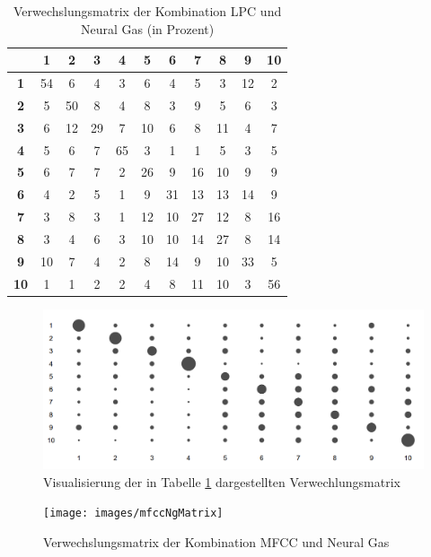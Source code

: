 \begin{table}[h]
	\centering
	\begin{tabular}{c|cccccccccc}
		& \textbf{1} & \textbf{2} & \textbf{3} & \textbf{4} & \textbf{5} & \textbf{6} & \textbf{7} & \textbf{8} & \textbf{9} & \textbf{10} \\ \hline
		\textbf{1} & 54 & 6 & 4 & 3 & 6 & 4 & 5 & 3 & 12 & 2 \\
		\textbf{2} & 5 & 50 & 8 & 4 & 8 & 3 & 9 & 5 & 6 & 3 \\
		\textbf{3} & 6 & 12 & 29 & 7 & 10 & 6 & 8 & 11 & 4 & 7 \\
		\textbf{4} & 5 & 6 & 7 & 65 & 3 & 1 & 1 & 5 & 3 & 5 \\
		\textbf{5} & 6 & 7 & 7 & 2 & 26 & 9 & 16 & 10 & 9 & 9 \\
		\textbf{6} & 4 & 2 & 5 & 1 & 9 & 31 & 13 & 13 & 14 & 9 \\
		\textbf{7} & 3 & 8 & 3 & 1 & 12 & 10 & 27 & 12 & 8 & 16 \\
		\textbf{8} & 3 & 4 & 6 & 3 & 10 & 10 & 14 & 27 & 8 & 14 \\
		\textbf{9} & 10 & 7 & 4 & 2 & 8 & 14 & 9 & 10 & 33 & 5 \\
		\textbf{10} & 1 & 1 & 2 & 2 & 4 & 8 & 11 & 10 & 3 & 56 \\
	\end{tabular}
	\caption{Verwechslungsmatrix der Kombination LPC und Neural Gas (in Prozent)}
	\label{tbl:verwechslungsmatrix}
\end{table}

\begin{figure}[h]
  \centering
  \includegraphics[width=0.8\linewidth]{images/lpcNgMatrix}
  \caption{Visualisierung der in Tabelle \ref{tbl:verwechslungsmatrix} dargestellten Verwechlungsmatrix}
  \label{fig:verwechslungsmatrixA}
\end{figure}

\begin{figure}[h]
  \centering
  \texttt{[image: images/mfccNgMatrix]}
  \caption{Verwechslungsmatrix der Kombination MFCC und Neural Gas}
  \label{fig:verwechslungsmatrixB}
\end{figure}

